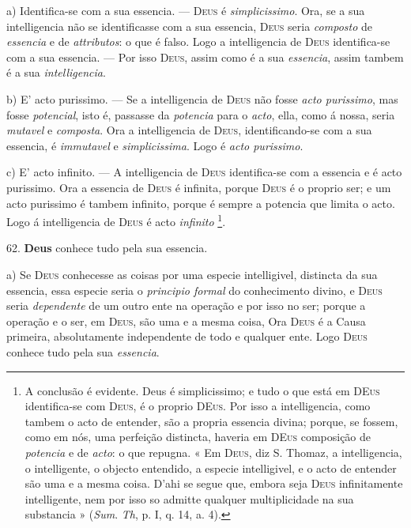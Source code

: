 a) Identifica-se com a sua essencia. --- \textsc{Deus} é \emph{simplicissimo}. Ora, se a sua intelligencia não se identificasse com a sua essencia, \textsc{Deus} seria \emph{composto} de \emph{essencia} e de \emph{attributos}: o que é falso. Logo a intelligencia de \textsc{Deus} identifica-se com a sua essencia. --- Por isso \textsc{Deus}, assim como é a sua \emph{essencia}, assim tambem é a sua \emph{intelligencia}.

b) E' acto purissimo. --- Se a intelligencia de \textsc{Deus} não fosse \emph{acto purissimo}, mas fosse \emph{potencial}, isto é, passasse da \emph{potencia} para o \emph{acto}, ella, como á nossa, seria \emph{mutavel} e \emph{composta}. Ora a intelligencia de \textsc{Deus}, identificando-se com a sua essencia, é \emph{immutavel} e \emph{simplicissima}. Logo é \emph{acto purissimo}.

c) E' acto infinito. --- A intelligencia de \textsc{Deus} identifica-se com a essencia e é acto purissimo. Ora a essencia de \textsc{Deus} é infinita, porque \textsc{Deus} é o proprio ser; e um acto purissimo é tambem infinito, porque é sempre a potencia que limita o acto. Logo á intelligencia de \textsc{Deus} é acto \emph{infinito} \footnote{A conclusão é evidente. Deus é simplicissimo; e tudo o que está em \textsc{DEus} identifica-se com \textsc{Deus}, é o proprio \textsc{DEus}. Por isso a intelligencia, como tambem o acto de entender, são a propria essencia divina; porque, se fossem, como em nós, uma perfeição distincta, haveria em \textsc{DEus} composição de \emph{potencia} e de \emph{acto}: o que repugna. « Em \textsc{Deus}, diz S. Thomaz, a intelligencia, o intelligente, o objecto entendido, a especie intelligivel, e o acto de entender são uma e a mesma coisa. D'ahi se segue que, embora seja \textsc{Deus} infinitamente intelligente, nem por isso so admitte qualquer multiplicidade na sua substancia » (\emph{Sum}. \emph{Th}, p. I, q. 14, a. 4).}.

62. \textbf{Deus} conhece tudo pela sua essencia.

a) Se \textsc{Deus} conhecesse as coisas por uma especie intelligivel, distincta da sua essencia, essa especie seria o \emph{principio formal} do conhecimento divino, e \textsc{Deus} seria \emph{dependente} de um outro ente na operação e por isso no ser; porque a operação e o ser, em \textsc{Deus}, são uma e a mesma coisa, Ora \textsc{Deus} é a Causa primeira, absolutamente independente de todo e qualquer ente. Logo \textsc{Deus} conhece tudo pela sua \emph{essencia}.

